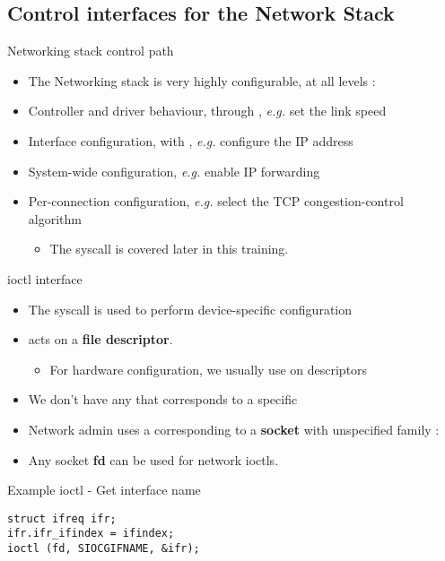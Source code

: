 \subsection{Control interfaces for the Network Stack}

\begin{frame}{Networking stack control path}
	\begin{itemize}
		\item The Networking stack is very highly configurable, at all levels :
		\item Controller and driver behaviour, through , \textit{e.g.} set the link speed
		\item Interface configuration, with , \textit{e.g.} configure the IP address
		\item System-wide configuration, \textit{e.g.} enable IP forwarding 
		\item Per-connection configuration, \textit{e.g.} select the TCP congestion-control algorithm
			\begin{itemize}
				\item The  syscall is covered later in this training.
			\end{itemize}
	\end{itemize}
\end{frame}

\begin{frame}[fragile]{ioctl interface}
	\begin{itemize}
		\item The  syscall is used to perform device-specific configuration
		\item {} acts on a \textbf{file descriptor}.
			\begin{itemize}
				\item For hardware configuration, we usually use  on  descriptors
			\end{itemize}
		\item We don't have any  that corresponds to a specific 
		\item Network admin  uses a  corresponding to a \textbf{socket} with unspecified family : 
		\item Any socket \textbf{fd} can be used for network ioctls.
	\end{itemize}
	\begin{block}{Example ioctl - Get interface name}
	\begin{verbatim}
struct ifreq ifr;
ifr.ifr_ifindex = ifindex;
ioctl (fd, SIOCGIFNAME, &ifr);
	\end{verbatim}
	\end{block}
\end{frame}


